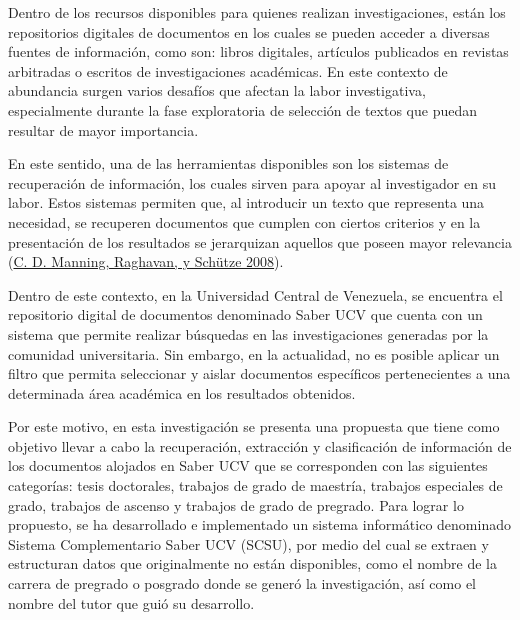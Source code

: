 \documentclass[
  12pt,
  openany]{book}
\begin{document}
Dentro de los recursos disponibles para quienes realizan investigaciones, están los repositorios digitales de documentos en los cuales se pueden acceder a diversas fuentes de información, como son: libros digitales, artículos publicados en revistas arbitradas o escritos de investigaciones académicas. En este contexto de abundancia surgen varios desafíos que afectan la labor investigativa, especialmente durante la fase exploratoria de selección de textos que puedan resultar de mayor importancia.

En este sentido, una de las herramientas disponibles son los sistemas de recuperación de información, los cuales sirven para apoyar al investigador en su labor. Estos sistemas permiten que, al introducir un texto que representa una necesidad, se recuperen documentos que cumplen con ciertos criterios y en la presentación de los resultados se jerarquizan aquellos que poseen mayor relevancia (\protect\hyperlink{ref-manning2008}{C. D. Manning, Raghavan, y Schütze 2008}).

Dentro de este contexto, en la Universidad Central de Venezuela, se encuentra el repositorio digital de documentos denominado Saber UCV que cuenta con un sistema que permite realizar búsquedas en las investigaciones generadas por la comunidad universitaria. Sin embargo, en la actualidad, no es posible aplicar un filtro que permita seleccionar y aislar documentos específicos pertenecientes a una determinada área académica en los resultados obtenidos.

Por este motivo, en esta investigación se presenta una propuesta que tiene como objetivo llevar a cabo la recuperación, extracción y clasificación de información de los documentos alojados en Saber UCV que se corresponden con las siguientes categorías: tesis doctorales, trabajos de grado de maestría, trabajos especiales de grado, trabajos de ascenso y trabajos de grado de pregrado. Para lograr lo propuesto, se ha desarrollado e implementado un sistema informático denominado Sistema Complementario Saber UCV (SCSU), por medio del cual se extraen y estructuran datos que originalmente no están disponibles, como el nombre de la carrera de pregrado o posgrado donde se generó la investigación, así como el nombre del tutor que guió su desarrollo.
\end{document}
